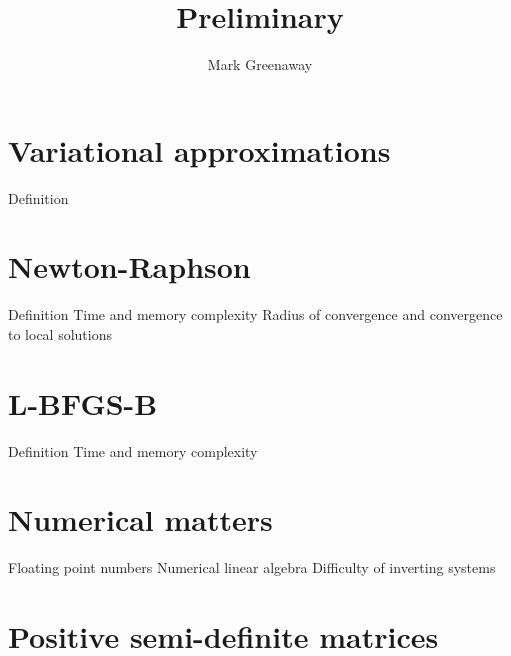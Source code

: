 \documentclass{article}[12pt]
\title{Preliminary}
\author{Mark Greenaway}
\begin{document}
\maketitle

\section{Variational approximations}
Definition

\section{Newton-Raphson}
Definition
Time and memory complexity
Radius of convergence and convergence to local solutions

\section{L-BFGS-B}
Definition
Time and memory complexity

\section{Numerical matters}
Floating point numbers
Numerical linear algebra
Difficulty of inverting systems

\section{Positive semi-definite matrices}



\end{document}
